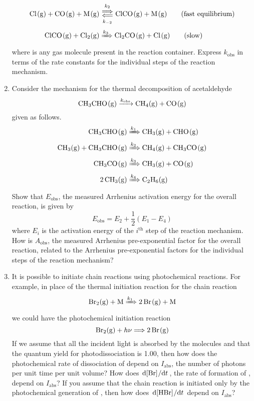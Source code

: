 \documentclass[../psets.tex]{subfiles}
\begin{document}
\begin{enumerate}[label={\textbf{29-\arabic*.}},leftmargin=3.5em]
\begin{align*}
        \ce{Cl(g) + CO(g) + M(g)} &\Longleftrightarrows[k_2][k_{-2}] \ce{ClCO(g) + M(g)}\tag{fast equilibrium}\\
        \ce{ClCO(g) + Cl2(g)} &\xRightarrow{k_3} \ce{Cl2CO(g) + Cl(g)}\tag{slow}
    \end{align*}
    where  is any gas molecule present in the reaction container. Express $k_\text{obs}$ in terms of the rate constants for the individual steps of the reaction mechanism.
    \setcounter{enumi}{27}
    \item Consider the mechanism for the thermal decomposition of acetaldehyde
    \begin{equation*}
        \ce{CH3CHO(g) ->[$k_\text{obs}$] CH4(g) + CO(g)}
    \end{equation*}
    given as follows.
    \begin{align*}
        \ce{CH3CHO(g)} &\xRightarrow{k_1} \ce{CH3(g) + CHO(g)}\\
        \ce{CH3(g) + CH3CHO(g)} &\xRightarrow{k_2} \ce{CH4(g) + CH3CO(g)}\\
        \ce{CH3CO(g)} &\xRightarrow{k_3} \ce{CH3(g) + CO(g)}\\
        \ce{2CH3(g)} &\xRightarrow{k_4} \ce{C2H6(g)}
    \end{align*}
    Show that $E_\text{obs}$, the measured Arrhenius activation energy for the overall reaction, is given by
    \begin{equation*}
        E_\text{obs} = E_2+\frac{1}{2}(E_1-E_4)
    \end{equation*}
    where $E_i$ is the activation energy of the $i^\text{th}$ step of the reaction mechanism. How is $A_\text{obs}$, the measured Arrhenius pre-exponential factor for the overall reaction, related to the Arrhenius pre-exponential factors for the individual steps of the reaction mechanism?
    \setcounter{enumi}{32}
    \item It is possible to initiate chain reactions using photochemical reactions. For example, in place of the thermal initiation reaction for the  chain reaction
    \begin{equation*}
        \ce{Br2(g) + M} \xRightarrow{k_1} \ce{2Br(g) + M}
    \end{equation*}
    we could have the photochemical initiation reaction
    \begin{equation*}
        \ce{Br2(g) + $h\nu$} \Longrightarrow \ce{2Br(g)}
    \end{equation*}
    If we assume that all the incident light is absorbed by the  molecules and that the quantum yield for photodissociation is 1.00, then how does the photochemical rate of dissociation of  depend on $I_\text{abs}$, the number of photons per unit time per unit volume? How does $\dv*{\cnc{Br}}{t}$, the rate of formation of , depend on $I_\text{abs}$? If you assume that the chain reaction is initiated only by the photochemical generation of , then how does $\dv*{\cnc{HBr}}{t}$ depend on $I_\text{abs}$?

\end{enumerate}
\end{document}
